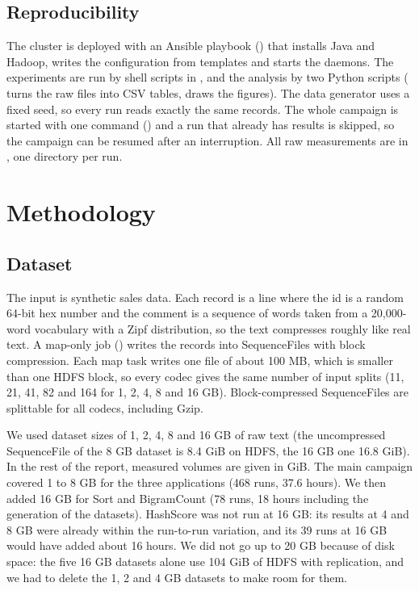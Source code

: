 \documentclass[11pt,a4paper]{article}
\begin{document}
\subsection{Reproducibility}
The cluster is deployed with an Ansible playbook () that installs Java and Hadoop, writes the configuration from templates and starts the daemons. The experiments are run by shell scripts in , and the analysis by two Python scripts ( turns the raw files into CSV tables,  draws the figures). The data generator uses a fixed seed, so every run reads exactly the same records. The whole campaign is started with one command () and a run that already has results is skipped, so the campaign can be resumed after an interruption. All raw measurements are in , one directory per run.

\section{Methodology}
\subsection{Dataset}
The input is synthetic sales data. Each record is a line  where the id is a random 64-bit hex number and the comment is a sequence of words taken from a 20,000-word vocabulary with a Zipf distribution, so the text compresses roughly like real text. A map-only job () writes the records into SequenceFiles with block compression. Each map task writes one file of about 100 MB, which is smaller than one HDFS block, so every codec gives the same number of input splits (11, 21, 41, 82 and 164 for 1, 2, 4, 8 and 16 GB). Block-compressed SequenceFiles are splittable for all codecs, including Gzip.

We used dataset sizes of 1, 2, 4, 8 and 16 GB of raw text (the uncompressed SequenceFile of the 8 GB dataset is 8.4 GiB on HDFS, the 16 GB one 16.8 GiB). In the rest of the report, measured volumes are given in GiB. The main campaign covered 1 to 8 GB for the three applications (468 runs, 37.6 hours). We then added 16 GB for Sort and BigramCount (78 runs, 18 hours including the generation of the datasets). HashScore was not run at 16 GB: its results at 4 and 8 GB were already within the run-to-run variation, and its 39 runs at 16 GB would have added about 16 hours. We did not go up to 20 GB because of disk space: the five 16 GB datasets alone use 104 GiB of HDFS with replication, and we had to delete the 1, 2 and 4 GB datasets to make room for them.
\end{document}
